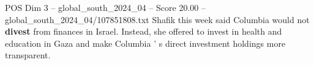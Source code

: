 \begin{textsample}{POS Dim 3 – global\_south\_2024\_04 – Score 20.00 – global\_south\_2024\_04/107851808.txt}
Shafik this week said Columbia would not \textbf{divest} from finances in Israel.
Instead, she offered to invest in health and education in Gaza and make Columbia ' s direct investment holdings more transparent.

\end{textsample}
